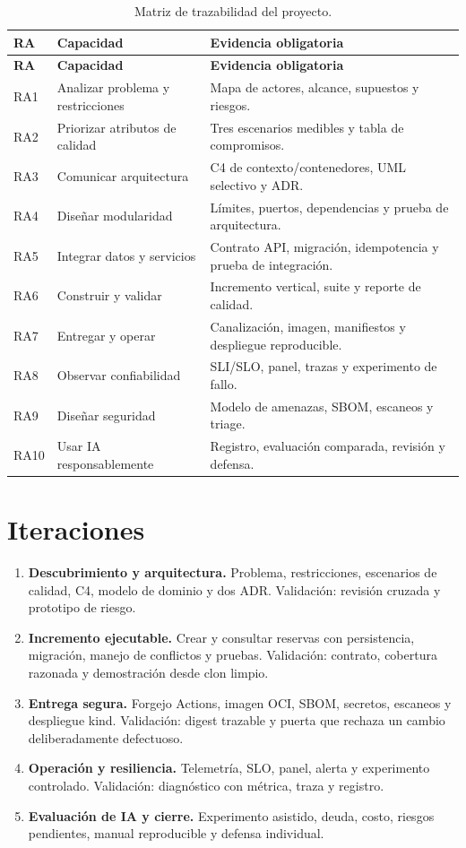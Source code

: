\begin{longtable}{p{1.2cm}p{5.1cm}p{8cm}}
\caption{Matriz de trazabilidad del proyecto.}\\
\toprule
\textbf{RA} & \textbf{Capacidad} & \textbf{Evidencia obligatoria}\\
\midrule
\endfirsthead
\toprule
\textbf{RA} & \textbf{Capacidad} & \textbf{Evidencia obligatoria}\\
\midrule
\endhead
RA1 & Analizar problema y restricciones & Mapa de actores, alcance, supuestos y riesgos.\\
RA2 & Priorizar atributos de calidad & Tres escenarios medibles y tabla de compromisos.\\
RA3 & Comunicar arquitectura & C4 de contexto/contenedores, UML selectivo y ADR.\\
RA4 & Diseñar modularidad & Límites, puertos, dependencias y prueba de arquitectura.\\
RA5 & Integrar datos y servicios & Contrato API, migración, idempotencia y prueba de integración.\\
RA6 & Construir y validar & Incremento vertical, suite y reporte de calidad.\\
RA7 & Entregar y operar & Canalización, imagen, manifiestos y despliegue reproducible.\\
RA8 & Observar confiabilidad & SLI/SLO, panel, trazas y experimento de fallo.\\
RA9 & Diseñar seguridad & Modelo de amenazas, SBOM, escaneos y triage.\\
RA10 & Usar IA responsablemente & Registro, evaluación comparada, revisión y defensa.\\
\bottomrule
\end{longtable}

\section{Iteraciones}

\begin{enumerate}
  \item \textbf{Descubrimiento y arquitectura.} Problema, restricciones, escenarios de calidad, C4, modelo de dominio y dos ADR. Validación: revisión cruzada y prototipo de riesgo.
  \item \textbf{Incremento ejecutable.} Crear y consultar reservas con persistencia, migración, manejo de conflictos y pruebas. Validación: contrato, cobertura razonada y demostración desde clon limpio.
  \item \textbf{Entrega segura.} Forgejo Actions, imagen OCI, SBOM, secretos, escaneos y despliegue kind. Validación: digest trazable y puerta que rechaza un cambio deliberadamente defectuoso.
  \item \textbf{Operación y resiliencia.} Telemetría, SLO, panel, alerta y experimento controlado. Validación: diagnóstico con métrica, traza y registro.
  \item \textbf{Evaluación de IA y cierre.} Experimento asistido, deuda, costo, riesgos pendientes, manual reproducible y defensa individual.
\end{enumerate}

